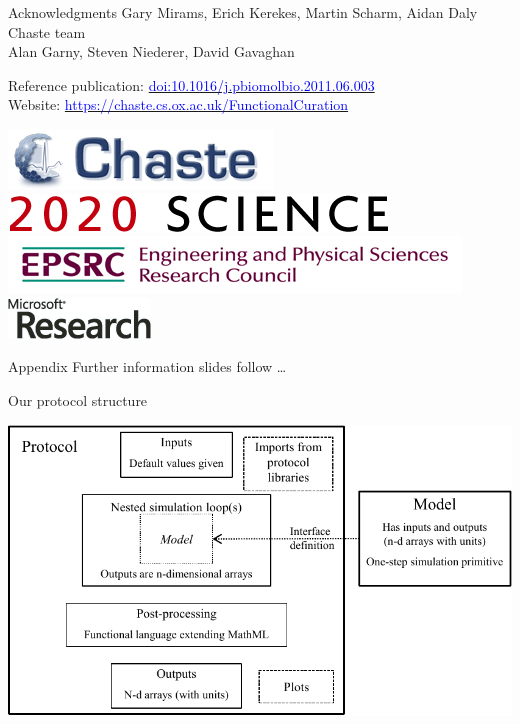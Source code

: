 \documentclass[t,xcolor={usenames,dvipsnames}]{beamer}
\newcommand{\myhref}[2]{\href{#1}{\textcolor{Blue}{#2}}}
\newcommand{\myurl}[1]{\myhref{#1}{#1}}
\newcommand{\doi}[1]{\myhref{http://dx.doi.org/#1}{doi:#1}}
\begin{document}
\begin{frame}{Acknowledgments}
Gary Mirams, Erich Kerekes, Martin Scharm, Aidan Daly\\
Chaste team\\
Alan Garny, Steven Niederer, David Gavaghan

Reference publication: \doi{10.1016/j.pbiomolbio.2011.06.003}\\
Website: \myurl{https://chaste.cs.ox.ac.uk/FunctionalCuration}

\begin{center}
\includegraphics[scale=.9]{chaste-266x60}\\ \vspace{.3cm}
\includegraphics[scale=.7]{logo2020science}\\ \vspace{.4cm}
\includegraphics[width=.55\textwidth]{EPSRC1RGBLO} \hspace{.1cm}
\includegraphics[scale=.55]{logo_msr}
\end{center}
\end{frame}


\appendix

\begin{frame}{Appendix}
Further information slides follow \dots
\end{frame}

\begin{frame}{Our protocol structure}
\begin{center}
\includegraphics[width=\textwidth]{protocol_language}
\end{center}
\end{frame}
\end{document}

